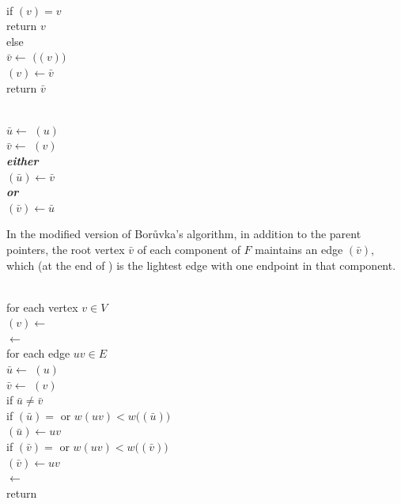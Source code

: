 \begin{exercises}
\begin{center}
\begin{minipage}[c]{0.42\linewidth}
\begin{pseudocode}
\\
if $(v) = v$\\
\Indent return $v$\\
else\\
\Indent $\bar{v} \gets$  $($$(v))$\\
\Indent {}$(v) \gets \bar{v}$\\
\Indent return $\bar{v}$
\end{pseudocode}
\end{minipage}\hfill
\begin{minipage}[c]{0.42\linewidth}
\begin{pseudocode}
\\
$\bar{u} \gets$  $(u)$\\
$\bar{v} \gets$  $(v)$\\
{\bfseries\itshape either}\\
\Indent {}$(\bar{u}) \gets \bar{v}$\\
{\bfseries\itshape or}\\
\Indent {}$(\bar{v}) \gets \bar{u}$
\end{pseudocode}
\end{minipage}
\end{center}

In the modified version of Borůvka’s algorithm, in addition to the parent pointers, the root vertex $\bar{v}$ of each component of $F$ maintains an edge $(\bar{v})$, which (at the end of ) is the lightest edge with one endpoint in that component.

\begin{pseudocode}
\\
for each vertex $v \in V$\\
\Indent {}$(v) \gets$  \\
 $\gets$  \\
for each edge $uv \in E$\\
\Indent $\bar{u} \gets$  $(u)$\\
\Indent $\bar{v} \gets$  $(v)$\\
\Indent if $\bar{u} \neq  \bar{v}$\\
\Indent\Indent if $(\bar{u}) =$  or $w(uv) < w($$(\bar{u}))$\\
\Indent\Indent\Indent {}$(\bar{u}) \gets uv$\\
\Indent\Indent if $(\bar{v}) =$  or $w(uv) < w($$(\bar{v}))$\\
\Indent\Indent\Indent {}$(\bar{v}) \gets uv$\\
\Indent\Indent {} $\gets$  \\
return 
\end{pseudocode}


\end{exercises}
